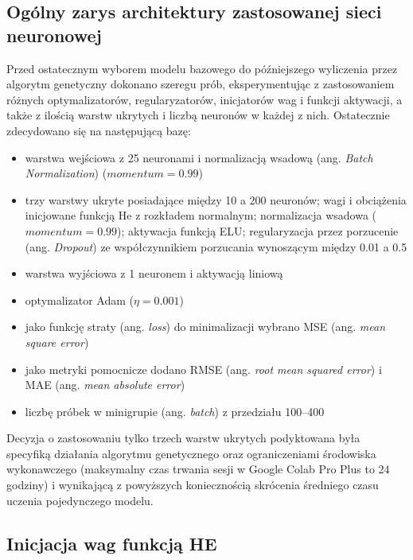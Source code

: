 \documentclass[a4paper,12pt]{article}
\numberwithin{figure}{section}
\begin{document}
    \subsection{Ogólny zarys architektury zastosowanej sieci neuronowej}

    Przed ostatecznym wyborem modelu bazowego do późniejszego wyliczenia przez algorytm genetyczny dokonano szeregu prób, eksperymentując z zastosowaniem różnych optymalizatorów, regularyzatorów, inicjatorów wag i funkcji aktywacji, a także z ilością warstw ukrytych i liczbą neuronów w każdej z nich. Ostatecznie zdecydowano się na następującą bazę:
    \begin{itemize}
        \item warstwa wejściowa z 25 neuronami i normalizacją wsadową (ang. \textit{Batch Normalization}) ($momentum = 0.99$)
        \item trzy warstwy ukryte posiadające między 10 a 200 neuronów; wagi i obciążenia inicjowane funkcją He z rozkładem normalnym; normalizacja wsadowa ($momentum = 0.99$); aktywacja funkcją ELU; regularyzacja przez porzucenie (ang. \textit{Dropout}) ze współczynnikiem porzucania wynoszącym między 0.01 a 0.5
        \item warstwa wyjściowa z 1 neuronem i aktywacją liniową
        \item optymalizator Adam ($\eta = 0.001$)
        \item jako funkcję straty (ang. \textit{loss}) do minimalizacji wybrano MSE (ang. \textit{mean square error})
        \item jako metryki pomocnicze dodano RMSE (ang. \textit{root mean squared error}) i MAE (ang. \textit{mean absolute error})
        \item liczbę próbek w minigrupie (ang. \textit{batch}) z przedziału 100--400
    \end{itemize}

    \bigskip

    Decyzja o zastosowaniu tylko trzech warstw ukrytych podyktowana była specyfiką działania algorytmu genetycznego oraz ograniczeniami środowiska wykonawczego (maksymalny czas trwania sesji w Google Colab Pro Plus to 24 godziny) i wynikającą z powyższych koniecznością skrócenia średniego czasu uczenia pojedynczego modelu.

    \subsection{Inicjacja wag funkcją HE}
\end{document}
